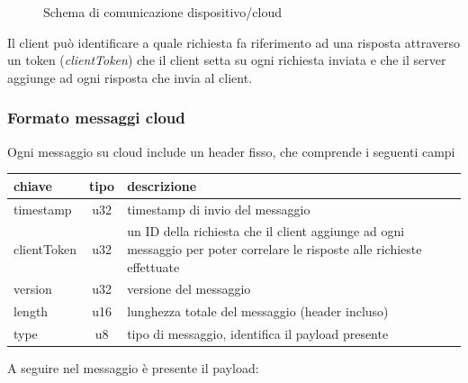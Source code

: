 \documentclass[12pt,a4paper,twoside,titlepage]{book}
\begin{document}
\begin{figure}[ht]
    \centering
    \caption{Schema di comunicazione dispositivo/cloud}
    \label{fig:comunicazione_cloud}
\end{figure}

Il client può identificare a quale richiesta fa riferimento ad una risposta attraverso un
token (\textit{clientToken}) che il client setta su ogni richiesta inviata e che il server aggiunge
ad ogni risposta che invia al client.

\subsubsection{Formato messaggi cloud}

Ogni messaggio su cloud include un header fisso, che comprende i seguenti campi

\begin{center}
\begin{longtable}{| p{5cm} | c | p{8cm} |}
    \hline
    \textbf{chiave} & \textbf{tipo} & \textbf{descrizione} \\ \hline
    timestamp & u32 & timestamp di invio del messaggio \\ \hline
    clientToken & u32 & un ID della richiesta che il client aggiunge ad ogni messaggio
        per poter correlare le risposte alle richieste effettuate \\ \hline
    version & u32 & versione del messaggio \\\hline
    length & u16 & lunghezza totale del messaggio (header incluso) \\ \hline
    type & u8 & tipo di messaggio, identifica il payload presente \\ \hline
\end{longtable}
\end{center}

A seguire nel messaggio è presente il payload:
\end{document}
